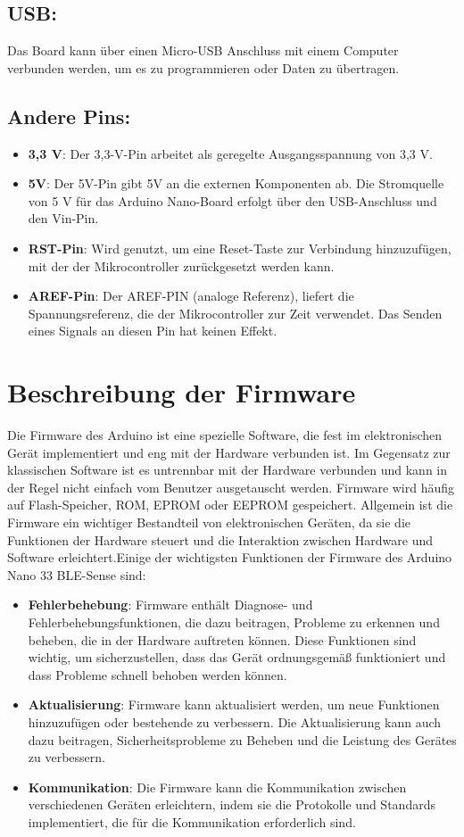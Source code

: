 \subsection{USB:}
Das Board kann über einen Micro-USB Anschluss mit einem Computer verbunden werden, um es zu programmieren oder Daten zu übertragen.
\subsection{Andere Pins:}
\begin{itemize}
	\item \textbf{3,3 V}: Der 3,3-V-Pin arbeitet als geregelte Ausgangsspannung von 3,3 V.
	\item \textbf{5V}: Der 5V-Pin gibt 5V an die externen Komponenten ab. Die Stromquelle von 5 V für das Arduino Nano-Board erfolgt über den USB-Anschluss und den Vin-Pin. 
	\item \textbf{RST-Pin}: Wird genutzt, um eine Reset-Taste zur Verbindung hinzuzufügen, mit der der Mikrocontroller zurückgesetzt werden kann.
	\item \textbf{AREF-Pin}: Der AREF-PIN (analoge Referenz), liefert die Spannungsreferenz, die der Mikrocontroller zur Zeit verwendet. Das Senden eines Signals an diesen Pin hat keinen Effekt. 
\end{itemize}
\section{Beschreibung der Firmware}
Die Firmware des Arduino ist eine spezielle Software, die fest im elektronischen Gerät implementiert und eng mit der Hardware verbunden ist. Im Gegensatz zur klassischen Software ist es untrennbar mit der Hardware verbunden und kann in der Regel nicht einfach vom Benutzer ausgetauscht werden. Firmware wird häufig auf Flash-Speicher, ROM, EPROM oder EEPROM gespeichert. Allgemein ist die Firmware ein wichtiger Bestandteil von elektronischen Geräten, da sie die Funktionen der Hardware steuert und die Interaktion zwischen Hardware und Software erleichtert.Einige der wichtigsten Funktionen der Firmware des Arduino Nano 33 BLE-Sense sind:
\\ \cite{Bruhlmann.2012}
\begin{itemize}
	\item \textbf{Fehlerbehebung}: Firmware enthält Diagnose- und Fehlerbehebungsfunktionen, die dazu beitragen, Probleme zu erkennen und beheben, die in der Hardware auftreten können. Diese Funktionen sind wichtig, um sicherzustellen, dass das Gerät ordnungsgemäß funktioniert und dass Probleme schnell behoben werden können. 
	\item \textbf{Aktualisierung}: Firmware kann aktualisiert werden, um neue Funktionen hinzuzufügen oder bestehende zu verbessern. Die Aktualisierung kann auch dazu beitragen, Sicherheitsprobleme zu Beheben und die Leistung des Gerätes zu verbessern. 
	\item \textbf{Kommunikation}: Die Firmware kann die Kommunikation zwischen verschiedenen Geräten erleichtern, indem sie die Protokolle und Standards implementiert, die für die Kommunikation erforderlich sind.
\end{itemize}
